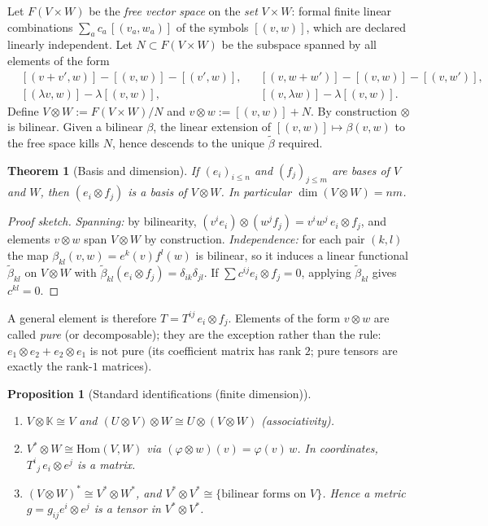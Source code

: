 \documentclass[11pt,a4paper]{article}
\newcounter{thm}[section]
\numberwithin{equation}{section}
\theoremstyle{definition}
\theoremstyle{plain}
\newtheorem{theorem}[thm]{Theorem}
\newtheorem{proposition}[thm]{Proposition}
\newcommand{\K}{\mathbb{K}}
\newcommand{\Hom}{\mathrm{Hom}}
\begin{document}

Let $F(V\times W)$ be the \emph{free vector space} on the \emph{set} $V\times W$: formal finite linear combinations
$\sum_a c_a\,[(v_a,w_a)]$ of the symbols $[(v,w)]$, which are declared linearly independent.
Let $N\subset F(V\times W)$ be the subspace spanned by all elements of the form
\begin{align*}
&[(v+v',w)]-[(v,w)]-[(v',w)], & &[(v,w+w')]-[(v,w)]-[(v,w')],\\
&[(\lambda v,w)]-\lambda[(v,w)], & &[(v,\lambda w)]-\lambda[(v,w)].
\end{align*}
Define $V\otimes W:=F(V\times W)/N$ and $v\otimes w:=[(v,w)]+N$. By construction $\otimes$ is bilinear.
Given a bilinear $\beta$, the linear extension of $[(v,w)]\mapsto\beta(v,w)$ to the free space kills $N$,
hence descends to the unique $\tilde\beta$ required. 

\begin{theorem}[Basis and dimension]\label{thm:tensorbasis}
If $(e_i)_{i\le n}$ and $(f_j)_{j\le m}$ are bases of $V$ and $W$, then $(e_i\otimes f_j)$ is a basis of $V\otimes W$.
In particular $\dim(V\otimes W)=nm$.
\end{theorem}
\begin{proof}[Proof sketch]
\emph{Spanning:} by bilinearity, $(v^ie_i)\otimes(w^jf_j)=v^iw^j\,e_i\otimes f_j$, and elements $v\otimes w$ span $V\otimes W$ by construction.
\emph{Independence:} for each pair $(k,l)$ the map $\beta_{kl}(v,w)=e^k(v)f^l(w)$ is bilinear, so it induces a linear
functional $\tilde\beta_{kl}$ on $V\otimes W$ with $\tilde\beta_{kl}(e_i\otimes f_j)=\delta_{ik}\delta_{jl}$. If $\sum c^{ij}e_i\otimes f_j=0$,
applying $\tilde\beta_{kl}$ gives $c^{kl}=0$.
\end{proof}

A general element is therefore $T=T^{ij}\,e_i\otimes f_j$. Elements of the form $v\otimes w$ are called
\emph{pure} (or decomposable); they are the exception rather than the rule: $e_1\otimes e_2+e_2\otimes e_1$ is not pure
(its coefficient matrix has rank $2$; pure tensors are exactly the rank-$1$ matrices).

\begin{proposition}[Standard identifications (finite dimension)]
\begin{enumerate}
  \item $V\otimes\K\cong V$ and $(U\otimes V)\otimes W\cong U\otimes(V\otimes W)$ (associativity).
  \item $V^*\otimes W\cong\Hom(V,W)$ via $(\varphi\otimes w)(v)=\varphi(v)\,w$. In coordinates, $T^{i}{}_{j}\,e_i\otimes e^j$ is a matrix.
  \item $(V\otimes W)^*\cong V^*\otimes W^*$, and $V^*\otimes V^*\cong\{\text{bilinear forms on }V\}$. Hence a metric $g=g_{ij}e^i\otimes e^j$ is a tensor in $V^*\otimes V^*$.
\end{enumerate}
\end{proposition}
\end{document}

